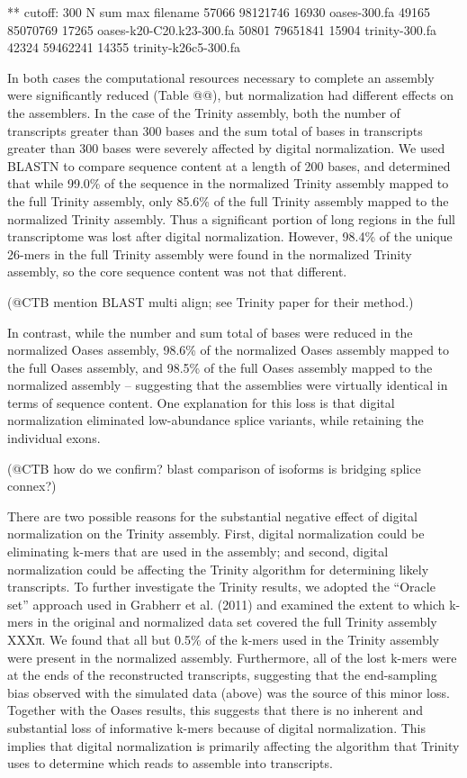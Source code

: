 \documentclass[10pt]{article}
\begin{document}
** cutoff: 300
N       sum     max     filename
57066   98121746        16930   oases-300.fa
49165   85070769        17265   oases-k20-C20.k23-300.fa
50801   79651841        15904   trinity-300.fa
42324   59462241        14355   trinity-k26c5-300.fa

In both cases the computational resources necessary to complete an
assembly were significantly reduced (Table @@), but normalization had
different effects on the assemblers.  In the case of the Trinity
assembly, both the number of transcripts greater than 300 bases and
the sum total of bases in transcripts greater than 300 bases were
severely affected by digital normalization.  We used BLASTN to compare
sequence content at a length of 200 bases, and determined that while
99.0\% of the sequence in the normalized Trinity assembly mapped to
the full Trinity assembly, only 85.6\% of the full Trinity assembly
mapped to the normalized Trinity assembly.  Thus a significant portion
of long regions in the full transcriptome was lost after digital
normalization.  However, 98.4\% of the unique 26-mers in the full
Trinity assembly were found in the normalized Trinity assembly, 
so the core sequence content was not that different.

(@CTB mention BLAST multi align; see Trinity
paper for their method.)

In contrast, while the number and sum total of bases were reduced in
the normalized Oases assembly, 98.6\% of the normalized Oases
assembly mapped to the full Oases assembly, and 98.5\% of the full
Oases assembly mapped to the normalized assembly -- suggesting that
the assemblies were virtually identical in terms of sequence content.
One explanation for this loss is that digital normalization
eliminated low-abundance splice variants, while retaining the
individual exons.

(@CTB how do we confirm?  blast comparison of isoforms is bridging splice connex?)

There are two possible reasons for the substantial negative effect of
digital normalization on the Trinity assembly.  First, digital
normalization could be eliminating k-mers that are used in the
assembly; and second, digital normalization could be affecting the
Trinity algorithm for determining likely transcripts.  To further
investigate the Trinity results, we adopted the ``Oracle set''
approach used in Grabherr et al. (2011) and examined the extent to
which k-mers in the original and normalized data set covered the full
Trinity assembly XXXπ.  We found that all but 0.5\% of the k-mers used in
the Trinity assembly were present in the normalized assembly.
Furthermore, all of the lost k-mers were at the ends of the
reconstructed transcripts, suggesting that the end-sampling bias
observed with the simulated data (above) was the source of this minor loss.
Together with the Oases results, this suggests that there is no
inherent and substantial loss of informative k-mers because of digital
normalization.  This implies that digital normalization is primarily
affecting the algorithm that Trinity uses to determine which reads to
assemble into transcripts.
\end{document}
